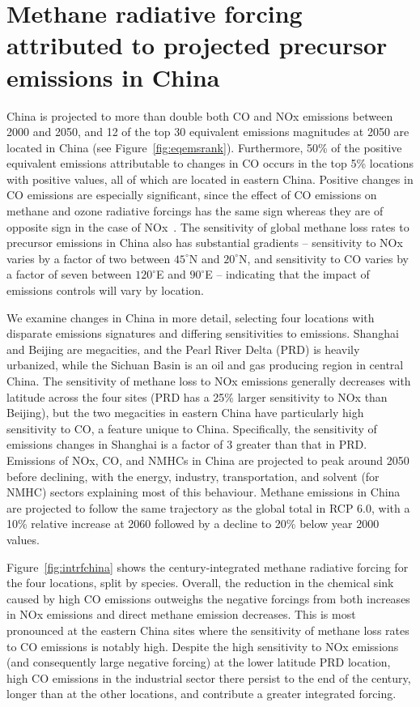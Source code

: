 \section{Methane radiative forcing attributed to projected precursor emissions in China}
\label{sec:china}
China is projected to more than double both CO and NOx emissions between 2000 and 2050, and 12 of the top 30 equivalent emissions magnitudes at 2050 are located in China (see Figure~\ref{fig:eqemsrank}). Furthermore, 50\% of the positive equivalent emissions attributable to changes in CO occurs in the top 5\% locations with positive values, all of which are located in eastern China. Positive changes in CO emissions are especially significant, since the effect of CO emissions on methane and ozone radiative forcings has the same sign whereas they are of opposite sign in the case of NOx~\citep{ref:myhre2013}. The sensitivity of global methane loss rates to precursor emissions in China also has substantial gradients -- sensitivity to NOx varies by a factor of two between $45^{\circ}$N and $20^{\circ}$N, and sensitivity to CO varies by a factor of seven between $120^{\circ}$E and $90^{\circ}$E -- indicating that the impact of emissions controls will vary by location. 

We examine changes in China in more detail, selecting four locations with disparate emissions signatures and differing sensitivities to emissions. Shanghai and Beijing are megacities, and the Pearl River Delta (PRD) is heavily urbanized, while the Sichuan Basin is an oil and gas producing region in central China. The sensitivity of methane loss to NOx emissions generally decreases with latitude across the four sites (PRD has a 25\% larger sensitivity to NOx than Beijing), but the two megacities in eastern China have particularly high sensitivity to CO, a feature unique to China. Specifically, the sensitivity of  emissions changes in Shanghai is a factor of 3 greater than that in PRD. Emissions of NOx, CO, and NMHCs in China are projected to peak around 2050 before declining, with the energy, industry, transportation, and solvent (for NMHC) sectors explaining most of this behaviour. Methane emissions in China are projected to follow the same trajectory as the global total in RCP 6.0, with a 10\% relative increase at 2060 followed by a decline to 20\% below year 2000 values.

Figure~\ref{fig:intrfchina} shows the century-integrated methane radiative forcing for the four locations, split by species. Overall, the reduction in the chemical sink caused by high CO emissions outweighs the negative forcings from both increases in NOx emissions and direct methane emission decreases. This is most pronounced at the eastern China sites where the sensitivity of methane loss rates to CO emissions is notably high. Despite the high sensitivity to NOx emissions (and consequently large negative forcing) at the lower latitude PRD location, high CO emissions in the industrial sector there persist to the end of the century, longer than at the other locations, and contribute a greater integrated forcing.